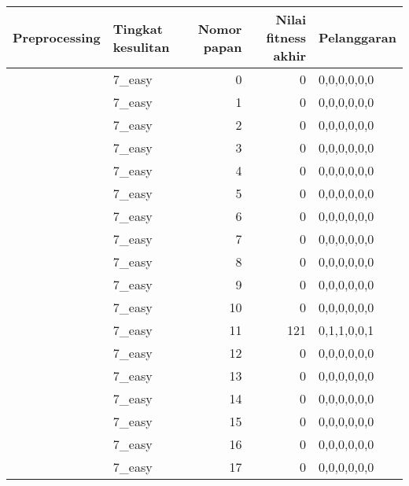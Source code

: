 \begin{tabular}{llrrl}
\hline
 Preprocessing   & Tingkat kesulitan   &   Nomor papan &   Nilai fitness akhir & Pelanggaran   \\
\hline
 [True]          & 7\_easy              &             0 &                     0 & 0,0,0,0,0,0   \\
 [True]          & 7\_easy              &             1 &                     0 & 0,0,0,0,0,0   \\
 [True]          & 7\_easy              &             2 &                     0 & 0,0,0,0,0,0   \\
 [True]          & 7\_easy              &             3 &                     0 & 0,0,0,0,0,0   \\
 [True]          & 7\_easy              &             4 &                     0 & 0,0,0,0,0,0   \\
 [True]          & 7\_easy              &             5 &                     0 & 0,0,0,0,0,0   \\
 [True]          & 7\_easy              &             6 &                     0 & 0,0,0,0,0,0   \\
 [True]          & 7\_easy              &             7 &                     0 & 0,0,0,0,0,0   \\
 [True]          & 7\_easy              &             8 &                     0 & 0,0,0,0,0,0   \\
 [True]          & 7\_easy              &             9 &                     0 & 0,0,0,0,0,0   \\
 [True]          & 7\_easy              &            10 &                     0 & 0,0,0,0,0,0   \\
 [True]          & 7\_easy              &            11 &                   121 & 0,1,1,0,0,1   \\
 [True]          & 7\_easy              &            12 &                     0 & 0,0,0,0,0,0   \\
 [True]          & 7\_easy              &            13 &                     0 & 0,0,0,0,0,0   \\
 [True]          & 7\_easy              &            14 &                     0 & 0,0,0,0,0,0   \\
 [True]          & 7\_easy              &            15 &                     0 & 0,0,0,0,0,0   \\
 [True]          & 7\_easy              &            16 &                     0 & 0,0,0,0,0,0   \\
 [True]          & 7\_easy              &            17 &                     0 & 0,0,0,0,0,0   \\

\end{tabular}
